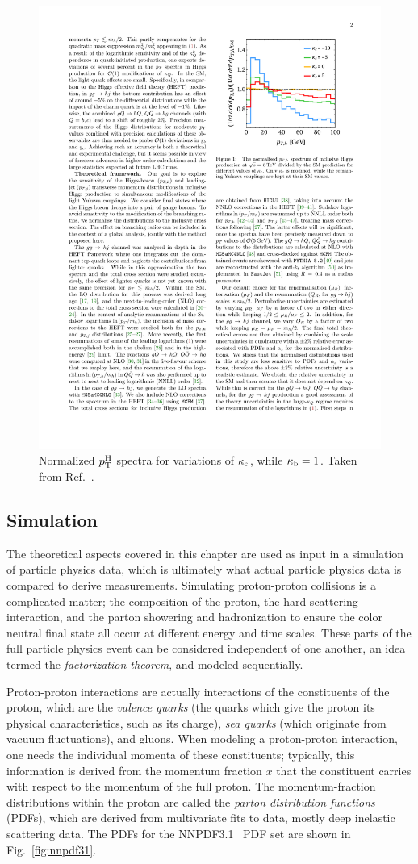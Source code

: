\begin{figure}[hbtp]
  \begin{center}
    \includegraphics[width=0.6\linewidth]{img/theory/kbkc_variations.pdf}
    \caption{
        Normalized $p_\mathrm{T}^\mathrm{H}$ spectra for variations of $\kappa_{\mathrm{c}}$, while $\kappa_{\mathrm{b}}=1$.
        Taken from Ref.~\cite{Bishara:2016jga}.
        }
    \label{fig:kbkc-precomputed}
  \end{center}
\end{figure}



\subsection{Simulation}


The theoretical aspects covered in this chapter are used as input in a simulation of particle physics data, which is ultimately what actual particle physics data is compared to derive measurements.
% 
Simulating proton-proton collisions is a complicated matter; the composition of the proton, the hard scattering interaction, and the parton showering and hadronization to ensure the color neutral final state all occur at different energy and time scales.
% 
These parts of the full particle physics event can be considered independent of one another, an idea termed the \textit{factorization theorem}, and modeled sequentially.


Proton-proton interactions are actually interactions of the constituents of the proton, which are the \textit{valence quarks} (the quarks which give the proton its physical characteristics, such as its charge), \textit{sea quarks} (which originate from vacuum fluctuations), and gluons.
% 
When modeling a proton-proton interaction, one needs the individual momenta of these constituents; typically, this information is derived from the momentum fraction $x$ that the constituent carries with respect to the momentum of the full proton.
% 
The momentum-fraction distributions within the proton are called the \textit{parton distribution functions} (PDFs), which are derived from multivariate fits to data, mostly deep inelastic scattering data.
% 
The PDFs for the NNPDF3.1~\cite{Ball:2017nwa} PDF set are shown in Fig.~\ref{fig:nnpdf31}.


